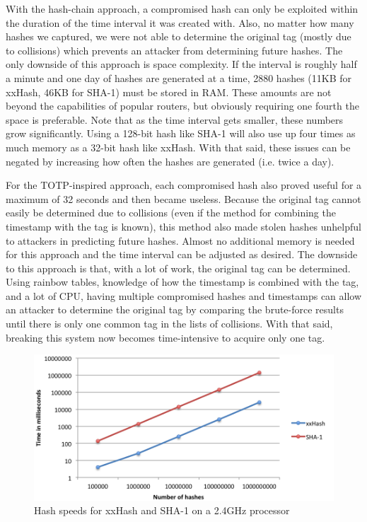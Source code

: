 \documentclass[12pt]{article} %
\begin{document}
With the hash-chain approach, a compromised hash can only be exploited within the duration of the time interval it was created with. Also, no matter how many hashes we captured, we were not able to determine the original tag (mostly due to collisions) which prevents an attacker from determining future hashes. The only downside of this approach is space complexity. If the interval is roughly half a minute and one day of hashes are generated at a time, 2880 hashes (11KB for xxHash, 46KB for SHA-1) must be stored in RAM. These amounts are not beyond the capabilities of popular routers, but obviously requiring one fourth the space is preferable. Note that as the time interval gets smaller, these numbers grow significantly. Using a 128-bit hash like SHA-1 will also use up four times as much memory as a 32-bit hash like xxHash. With that said, these issues can be negated by increasing how often the hashes are generated (i.e. twice a day).

For the TOTP-inspired approach, each compromised hash also proved useful for a maximum of 32 seconds and then became useless. Because the original tag cannot easily be determined due to collisions (even if the method for combining the timestamp with the tag is known), this method also made stolen hashes unhelpful to attackers in predicting future hashes. Almost no additional memory is needed for this approach and the time interval can be adjusted as desired. The downside to this approach is that, with a lot of work, the original tag can be determined. Using rainbow tables, knowledge of how the timestamp is combined with the tag, and a lot of CPU, having multiple compromised hashes and timestamps can allow an attacker to determine the original tag by comparing the brute-force results until there is only one common tag in the lists of collisions. With that said, breaking this system now becomes time-intensive to acquire only one tag.

\begin{figure}[ht!]
\includegraphics[width=160mm]{hashspeeds.png}
\caption{Hash speeds for xxHash and SHA-1 on a 2.4GHz processor}
\end{figure}
\end{document}
